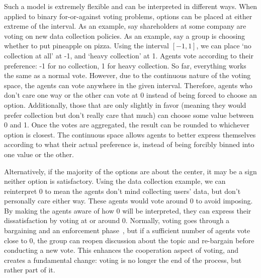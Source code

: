 Such a model is extremely flexible and can be interpreted in different ways.
When applied to binary for-or-against voting problems, options can be placed at either
extreme of the interval.
As an example, say shareholders at some company are voting on new data collection
policies.
As an example, say a group is choosing whether to put pineapple on pizza.
Using the interval $[-1, 1]$, we can place `no collection at all' at -1, and `heavy
collection' at 1.
Agents vote according to their preference: -1 for no collection, 1 for heavy collection.
So far, everything works the same as a normal vote.
However, due to the continuous nature of the voting space, the agents can vote
anywhere in the given interval.
Therefore, agents who don't care one way or the other can vote at 0 instead of being
forced to choose an option.
Additionally, those that are only slightly in favor (meaning they would prefer
collection but don't really care that much) can choose some value between 0 and 1.
Once the votes are aggregated, the result can be rounded to whichever option is
closest.
The continuous space allows agents to better express themselves according to what
their actual preference is, instead of being forcibly binned into one value or the
other.

Alternatively, if the majority of the options   are about
the center, it may be a sign neither option is satisfactory.
Using the data collection example, we can reinterpret 0 to mean the agents don't
mind collecting users' data, but don't personally care either way.
These agents would vote around 0 to avoid imposing.
By making the agents aware of how 0 will be interpreted, they can express their
dissatisfaction by voting at or around 0.
Normally, voting goes through a bargaining and an enforcement
phase~\cite{Fearon1998}, but if a sufficient number of agents vote close to 0, the
group can reopen discussion about the topic and re-bargain before conducting a new vote.
This enhances the cooperation aspect of voting, and creates a fundamental change:
voting is no longer the end of the process, but rather part of it.

